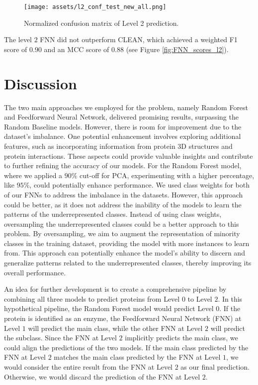 \documentclass{bioinfo}
\begin{document}
\begin{figure}[!htb]
\texttt{[image: assets/l2\_conf\_test\_new\_all.png]}
\caption{Normalized confusion matrix of Level 2 prediction.}\label{fig:FNN_conf_l2}
\end{figure}

The level $2$ FNN did not outperform CLEAN, which achieved a weighted F1 score of $0.90$ and an MCC score of $0.88$ (see Figure \ref{fig:FNN_scores_l2}).
\section{Discussion}
The two main approaches we employed for the problem, namely Random Forest and Feedforward Neural Network, delivered promising results, surpassing the Random Baseline models.
However, there is room for improvement due to the dataset's imbalance.
One potential enhancement involves exploring additional features, such as incorporating information from protein 3D structures and protein interactions.
These aspects could provide valuable insights and contribute to further refining the accuracy of our models.
For the Random Forest model, where we applied a $90\%$ cut-off for PCA, experimenting with a higher percentage, 
like $95\%$, could potentially enhance performance.
We used class weights for both of our FNNs to address the imbalance in the datasets.
However, this approach could be better, as it does not address the inability of the models to learn the patterns of the underrepresented classes.
Instead of using class weights, oversampling the underrepresented classes could be a better approach to this problem.
By oversampling, we aim to augment the representation of minority classes in the training dataset, 
providing the model with more instances to learn from. 
This approach can potentially enhance the model's ability to discern and generalize patterns related to the underrepresented 
classes, thereby improving its overall performance.

An idea for further development is to create a comprehensive pipeline by combining all three models to predict proteins from Level $0$ to Level $2$.
In this hypothetical pipeline, the Random Forest model would predict Level $0$.
If the protein is identified as an enzyme, the Feedforward Neural Network (FNN) at Level $1$ will predict the main class,
while the other FNN at Level $2$ will predict the subclass.
Since the FNN at Level $2$ implicitly predicts the main class, we could align the predictions of the two models.
If the main class predicted by the FNN at Level $2$ matches the main class predicted by the FNN at Level $1$, 
we would consider the entire result from the FNN at Level $2$ as our final prediction.
Otherwise, we would discard the prediction of the FNN at Level $2$.\\
\end{document}
